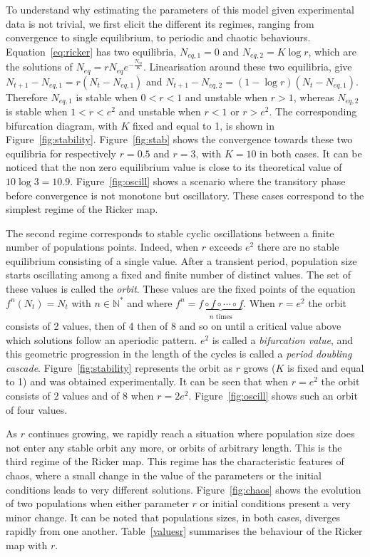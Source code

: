 \documentclass[12pt]{article}
\begin{document}
	To understand why estimating the parameters of this model given experimental data is not trivial, we first elicit the different its regimes, ranging from convergence to single equilibrium, to periodic and  chaotic behaviours. Equation~\ref{eq:ricker} has two equilibria, $N_{eq, 1} = 0$ and $N_{eq, 2} = K\log r$, which are the solutions of  $N_{eq} = r N_{eq} e^{-\frac{N_{eq}}{K}}$. Linearisation around these two equilibria, give $N_{t+1} - N_{eq, 1} = r(N_{t} - N_{eq, 1})$ and $N_{t+1} - N_{eq, 2} = (1-\log r)(N_{t} - N_{eq, 1})$. Therefore $N_{eq, 1}$ is stable when $0 < r < 1$ and unstable when $r > 1$, whereas $N_{eq, 2}$ is stable when $1 < r < e^2$ and unstable when $r < 1$ or $r > e^2$. The corresponding bifurcation diagram, with $K$ fixed and equal to 1, is shown in Figure~\ref{fig:stability}. Figure~\ref{fig:stab} shows the convergence towards these two equilibria for respectively $r=0.5$ and $r=3$, with $K=10$ in both cases. It can be noticed that the non zero equilibrium value is close to its theoretical value of $10 \log 3 = 10.9$.  Figure~\ref{fig:oscill} shows a scenario where the transitory phase before convergence is not monotone but oscillatory. These cases correspond to the simplest regime of the Ricker map.
	
	The second regime corresponds to stable cyclic oscillations between a finite number of populations points. Indeed, when $r$ exceeds $e^2$ there are no stable equilibrium consisting of a single value. After a transient period, population size starts oscillating among a fixed and finite number of distinct values. The set of these values is called the \emph{orbit}. These values are the fixed points of the equation $f^n(N_t) = N_t$ with $n \in \mathbb{N^*}$ and where $f^n = \underbrace{f\circ f\circ \cdots \circ f}_{n\text{\ times}}$. When $r=e^2$ the orbit consists of 2 values, then of 4 then of 8 and so on until a critical value above which solutions follow an aperiodic pattern. $e^2$ is called a \emph{bifurcation value}, and this geometric progression in the length of the cycles is called a \emph{period doubling cascade}. Figure~\ref{fig:stability} represents the orbit as $r$ grows ($K$ is fixed and equal to 1) and was obtained experimentally. It can be seen that when $r=e^2$ the orbit consists of 2 values and of 8 when $r=2e^2$. Figure~\ref{fig:oscill} shows such an orbit of four values.
	
	As $r$ continues growing, we rapidly reach a situation where population size does not enter any stable orbit any more, or orbits of arbitrary length. This is the third regime of the Ricker map. This regime has the characteristic features of chaos, where a small change in the value of the parameters or the initial conditions leads to very different solutions. Figure~\ref{fig:chaos} shows the evolution of two populations when either parameter $r$ or initial conditions present a very minor change. It can be noted that populations sizes, in both cases, diverges rapidly from one another. Table~\ref{valuesr} summarises the behaviour of the Ricker map with $r$.
	
\end{document}
